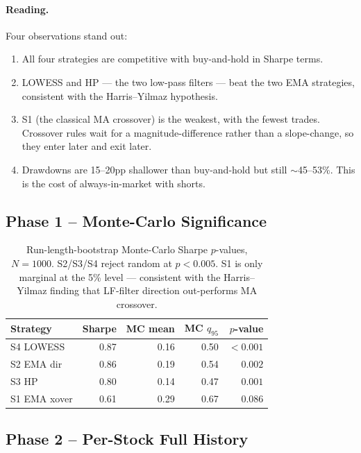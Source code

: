 \documentclass[11pt,a4paper]{article}
\begin{document}
\paragraph{Reading.} Four observations stand out:
\begin{enumerate}[leftmargin=1.5em,itemsep=2pt]
    \item All four strategies are competitive with buy-and-hold in Sharpe
          terms.
    \item LOWESS and HP --- the two low-pass filters --- beat the two EMA
          strategies, consistent with the Harris--Yilmaz hypothesis.
    \item S1 (the classical MA crossover) is the weakest, with the fewest
          trades. Crossover rules wait for a magnitude-difference rather than
          a slope-change, so they enter later and exit later.
    \item Drawdowns are 15--20pp shallower than buy-and-hold but still
          $\sim$45--53\%. This is the cost of always-in-market with shorts.
\end{enumerate}

\subsection{Phase 1 -- Monte-Carlo Significance}

\begin{table}[h]
\centering
\begin{tabular}{@{}lrrrr@{}}
\toprule
\textbf{Strategy} & \textbf{Sharpe} & \textbf{MC mean} & \textbf{MC $q_{95}$} & \textbf{$p$-value} \\
\midrule
S4 LOWESS    & 0.87 & 0.16 & 0.50 & $<0.001$ \\
S2 EMA dir   & 0.86 & 0.19 & 0.54 & $0.002$  \\
S3 HP        & 0.80 & 0.14 & 0.47 & $0.001$  \\
S1 EMA xover & 0.61 & 0.29 & 0.67 & $0.086$  \\
\bottomrule
\end{tabular}
\caption{Run-length-bootstrap Monte-Carlo Sharpe $p$-values, $N{=}1000$.
S2/S3/S4 reject random at $p<0.005$. S1 is only marginal at the 5\% level ---
consistent with the Harris--Yilmaz finding that LF-filter direction
out-performs MA crossover.}
\end{table}

\subsection{Phase 2 -- Per-Stock Full History}
\end{document}
